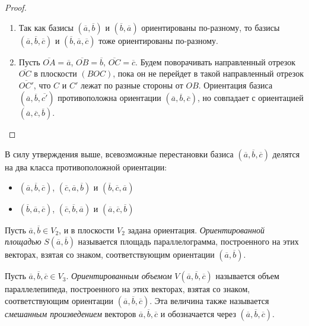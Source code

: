     \begin{proof}~
    	\begin{enumerate}
    		\item Так как базисы $(\overline{a}, \overline{b})$ и $(\overline{b}, \overline{a})$ ориентированы по-разному, то базисы $(\overline{a}, \overline{b}, \overline{c})$ и $(\overline{b}, \overline{a}, \overline{c})$ тоже ориентированы по-разному.
    		\item Пусть $\overline{OA} = \overline{a}$, $\overline{OB} = \overline{b}$, $\overline{OC} = \overline{c}$. Будем поворачивать направленный отрезок $\overline{OC}$ в плоскости $(BOC)$, пока он не перейдет в такой направленный отрезок $\overline{OC'}$, что $C$ и $C'$ лежат по разные стороны от $OB$. Ориентация базиса $(\overline{a}, \overline{b}, \overline{c'})$ противоположна ориентации $(\overline{a}, \overline{b}, \overline{c})$, но совпадает с ориентацией $(\overline{a}, \overline{c}, \overline{b})$.\qedhere
    	\end{enumerate}
    \end{proof}
    
    \begin{note}
    	В силу утверждения выше, всевозможные перестановки базиса $(\overline{a}, \overline{b}, \overline{c})$ делятся на два класса противоположной ориентации:
    	\begin{itemize}
    		\item $(\overline{a}, \overline{b}, \overline{c})$, $(\overline{c}, \overline{a}, \overline{b})$ и $(\overline{b}, \overline{c}, \overline{a})$
    		\item $(\overline{b}, \overline{a}, \overline{c})$, $(\overline{c}, \overline{b}, \overline{a})$ и $(\overline{a}, \overline{c}, \overline{b})$
    	\end{itemize}
    \end{note}
    
    \begin{definition}
    	Пусть $\overline{a}, \overline{b} \in V_2$, и в плоскости $V_2$ задана ориентация. \textit{Ориентированной площадью} $S(\overline{a}, \overline{b})$ называется площадь параллелограмма, построенного на этих векторах, взятая со знаком, соответствующим ориентации $(\overline{a}, \overline{b})$.
    \end{definition}
    
    \begin{definition}
    	Пусть $\overline{a}, \overline{b}, \overline{c} \in V_3$. \textit{Ориентированным объемом} $V(\overline{a}, \overline{b}, \overline{c})$ называется объем параллелепипеда, построенного на этих векторах, взятая со знаком, соответствующим ориентации $(\overline{a}, \overline{b}, \overline{c})$. Эта величина также называется \textit{смешанным произведением} векторов $\overline{a}, \overline{b}, \overline{c}$ и обозначается через $(\overline{a}, \overline{b}, \overline{c})$.
    \end{definition}
    

